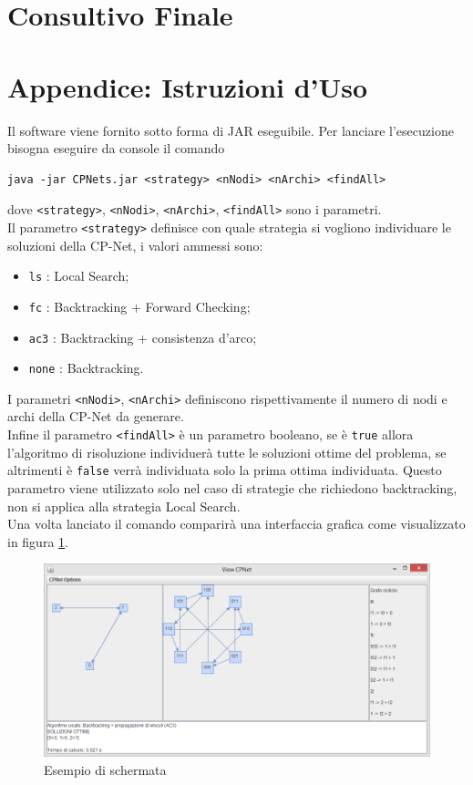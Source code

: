 \documentclass[a4paper,titlepage]{article}
\begin{document}
\section{Consultivo Finale}

\section{Appendice: Istruzioni d'Uso}
Il software viene fornito sotto forma di JAR eseguibile. Per lanciare l'esecuzione bisogna eseguire da console il comando
\begin{verbatim}
java -jar CPNets.jar <strategy> <nNodi> <nArchi> <findAll>
\end{verbatim}
dove \texttt{<strategy>}, \texttt{<nNodi>}, \texttt{<nArchi>}, \texttt{<findAll>} sono i parametri.\\
Il parametro \texttt{<strategy>} definisce con quale strategia si vogliono individuare le soluzioni della CP-Net, i valori ammessi sono:
\begin{itemize}
\item  \texttt{ls} : Local Search;
\item  \texttt{fc} : Backtracking + Forward Checking;
\item  \texttt{ac3} : Backtracking + consistenza d'arco;
\item  \texttt{none} : Backtracking.
\end{itemize}
I parametri \texttt{<nNodi>}, \texttt{<nArchi>} definiscono rispettivamente il numero di nodi e archi della CP-Net da generare.\\
Infine il parametro \texttt{<findAll>} è un parametro booleano, se è \texttt{true} allora l'algoritmo di risoluzione individuerà tutte le soluzioni ottime del problema, se altrimenti è \texttt{false} verrà individuata solo la prima ottima individuata. Questo parametro viene utilizzato solo nel caso di strategie che richiedono backtracking, non si applica alla strategia Local Search.\\
Una volta lanciato il comando comparirà una interfaccia grafica come visualizzato in figura \ref{fig:1}.\\
\begin{figure}
\centering
\includegraphics[scale=0.5]{../img/screen.png}
\caption{Esempio di schermata}\label{fig:1}
\end{figure}
\end{document}
